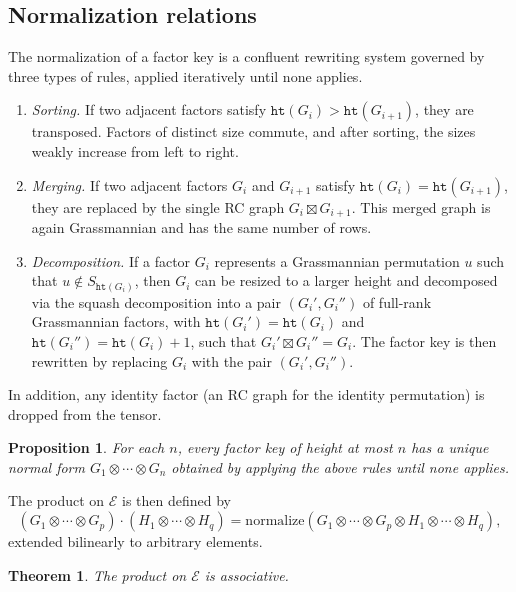 \documentclass{amsart}
\newtheorem{proposition}[lemma]{Proposition}
\newtheorem{theorem}{Theorem}[section]
\theoremstyle{definition}
\theoremstyle{remark}
\numberwithin{equation}{section}
\newcommand{\hr}{\mathtt{ht}}
\begin{document}
\subsection{Normalization relations}

The normalization of a factor key is a confluent rewriting system governed by three types of rules, applied iteratively until none applies.

\begin{enumerate}
\item \textit{Sorting.}  If two adjacent factors satisfy $\hr(G_i) > \hr(G_{i+1})$, they are transposed.  Factors of distinct size commute, and after sorting, the sizes weakly increase from left to right.

\item \textit{Merging.}  If two adjacent factors $G_i$ and $G_{i+1}$ satisfy $\hr(G_i) = \hr(G_{i+1})$, they are replaced by the single RC graph $G_i \boxtimes G_{i+1}$.  This merged graph is again Grassmannian and has the same number of rows.

\item \textit{Decomposition.}  If a factor $G_i$ represents a Grassmannian permutation $u$ such that $u\notin S_{\hr(G_i)}$, then $G_i$ can be resized to a larger height and decomposed via the squash decomposition into a pair $(G_i', G_i'')$ of full-rank Grassmannian factors, with $\hr(G_i')=\hr(G_i)$ and $\hr(G_i'')=\hr(G_i)+1$, such that $G_i' \boxtimes G_i'' = G_i$.  The factor key is then rewritten by replacing $G_i$ with the pair $(G_i', G_i'')$.
\end{enumerate}

In addition, any identity factor (an RC graph for the identity permutation) is dropped from the tensor.

\begin{proposition}\label{proposition:confluence}
For each $n$, every factor key of height at most $n$ has a unique normal form $G_1\otimes \cdots \otimes G_n$ obtained by applying the above rules until none applies.
\end{proposition}

The product on $\mathcal{E}$ is then defined by
\[
(G_1 \otimes \cdots \otimes G_p) \cdot (H_1 \otimes \cdots \otimes H_q) = \mathrm{normalize}(G_1 \otimes \cdots \otimes G_p \otimes H_1 \otimes \cdots \otimes H_q),
\]
extended bilinearly to arbitrary elements.

\begin{theorem}\label{theorem:associativity}
The product on $\mathcal{E}$ is associative.
\end{theorem}
\end{document}
